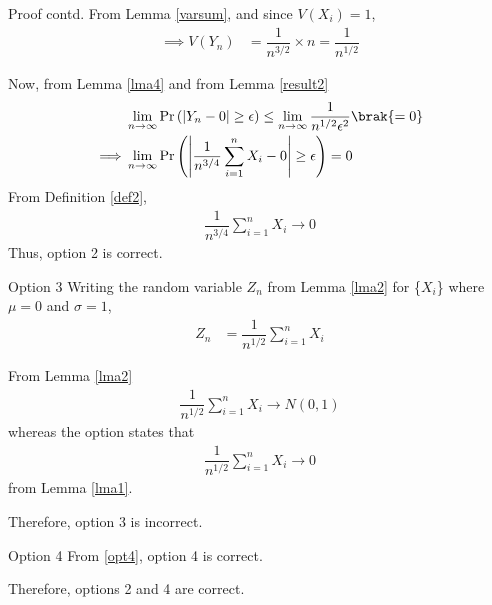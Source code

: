\documentclass{beamer}
\providecommand{\pr}[1]{\ensuremath{\Pr\left(#1\right)}}
\begin{document}
\begin{frame}{}
\begin{block}{Proof contd.}
From Lemma \ref{varsum}, and since $V(X_i)=1$, 
\begin{align}
    \implies V(Y_n) &= \dfrac{1}{n^{3/2}} \times n = \dfrac{1}{n^{1/2}}
\end{align}
\end{block}
Now, from Lemma \ref{lma4} and from Lemma \ref{result2}
\begin{align}
    &\lim_{n \to \infty}\pr{|Y_n-0|\geq \epsilon} \leq \lim_{n \to \infty }\dfrac{1}{n^{1/2}\epsilon^2}\brak{=0}\\
    \implies &\lim_{n \to \infty}\pr{\left | \dfrac{1}{n^{3/4}}\sum_{i=1}^n X_i - 0 \right|\geq \epsilon}=0
\end{align}
From Definition \ref{def2},
\begin{align}
    \dfrac{1}{n^{3/4}}\sum_{i=1}^n X_i \to 0
\end{align}
Thus, option 2 is correct.
\end{frame}
\begin{frame}{Option 3}
Writing the random variable $Z_n$ from Lemma \ref{lma2} for \{$X_i$\} where $\mu=0$ and $\sigma=1$,
\begin{align}
    Z_n &= \dfrac{1}{n^{1/2}} \sum_{i=1}^n X_i
\end{align}

From Lemma \ref{lma2} 
\begin{align}
    \dfrac{1}{n^{1/2}} \sum_{i=1}^n X_i \to  N(0,1)
\end{align}
whereas the option states that
\begin{align}
 \dfrac{1}{n^{1/2}} \sum_{i=1}^n X_i \to 0
\end{align} 
from Lemma \ref{lma1}.

Therefore, option 3 is incorrect.
\end{frame}
\begin{frame}{Option 4}
From \eqref{opt4}, option 4 is correct.

Therefore, options 2 and 4 are correct.
\end{frame}
\end{document}
